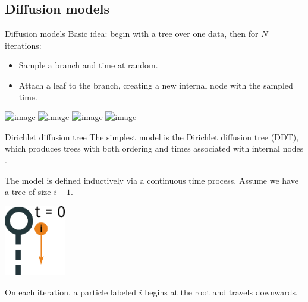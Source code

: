 \documentclass[10pt, compress]{beamer}
\begin{document}
\subsection{Diffusion models}

\begin{frame}{Diffusion models}
  Basic idea: begin with a tree over
    one data, then for $N$ iterations:
  \begin{itemize}
    \item Sample a branch and time at random.
    \item Attach a leaf to the branch,
      creating a new internal node with the sampled time.
  \end{itemize}
  \begin{center}
    \includegraphics<2>[width=\textwidth]{img/diffusion-1}
    \includegraphics<3>[width=\textwidth]{img/diffusion-2}
    \includegraphics<4>[width=\textwidth]{img/diffusion-3}
    \includegraphics<5>[width=\textwidth]{img/diffusion-4}
  \end{center}
\end{frame}

\begin{frame}{Dirichlet diffusion tree}
    The simplest model is the Dirichlet diffusion tree (DDT),
    which produces trees with both ordering
    and times associated with internal nodes \cite{Neal2003}.

    The model is defined inductively via a continuous time
    process. Assume we have a tree of size $i - 1$.

    \pause

    \begin{center}
      \includegraphics[width=0.2\textwidth]{img/ddt-1}
    \end{center}

    On each iteration, a particle labeled $i$ begins at the root and travels downwards.
\end{frame}
\end{document}
